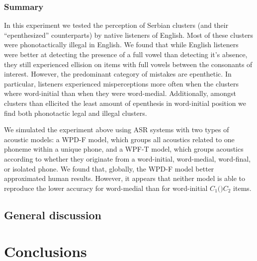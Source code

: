 {\subsubsection{Summary}
In this experiment we tested the perception of Serbian clusters (and their ``epenthesized'' counterparts) by native listeners of English. Most of these clusters were phonotactically illegal in English. We found that while English listeners were better at detecting the presence of a full vowel than detecting it's absence, they still experienced ellision on items with full vowels between the consonants of interest. However, the predominant category of mistakes are epenthetic. In particular, listeners experienced misperceptions more often when the clusters where word-initial than when they were word-medial. Additionally, amongst clusters than ellicited the least amount of epenthesis in word-initial position we find both phonotactic legal and illegal clusters.

We simulated the experiment above using ASR systems with two types of acoustic models: a WPD-F model, which groups all acoustics related to one phoneme within a unique phone, and a WPF-T model, which groups acoustics according to whether they originate from a word-initial, word-medial, word-final, or isolated phone.
We found that, globally, the WPD-F model better approximated human results. However, it appears that neither model is able to reproduce the lower accuracy for word-medial than for word-initial $C_{1}($\textipa{[@]}$)C_{2}$ items.
  
\subsection{General discussion}

\newpage
\section{Conclusions}




}
